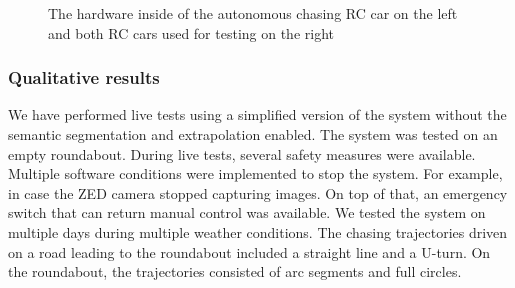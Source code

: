 \documentclass{ctuthesis/ctuthesis}
\begin{document}
\begin{figure}[h!]
    \centering
    \qquad
    \caption{The hardware inside of the autonomous chasing RC car on the left and both RC cars used for testing on the right}%
    \label{fig:rc_cars}%
\end{figure}



\subsubsection{Qualitative results}
We have performed live tests using a simplified version of the system without the semantic segmentation and extrapolation enabled. The system was tested on an empty roundabout. During live tests, several safety measures were available. Multiple software conditions were implemented to stop the system. For example, in case the ZED camera stopped capturing images. On top of that, an emergency switch that can return manual control was available. We tested the system on multiple days during multiple weather conditions. The chasing trajectories driven on a road leading to the roundabout included a straight line and a U-turn. On the roundabout, the trajectories consisted of arc segments and full circles. \par
\end{document}
